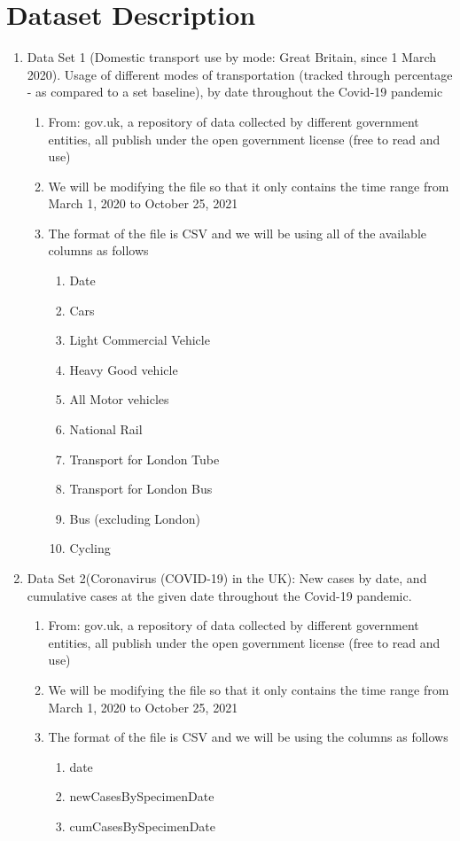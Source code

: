 \documentclass[fontsize=11pt]{article}
\begin{document}
  
\section*{Dataset Description}  
  
\begin{enumerate}  
    \item Data Set 1 (Domestic transport use by mode: Great Britain, since 1 March 2020).
Usage of different modes of transportation (tracked through percentage - as compared to a set baseline), by date throughout the Covid-19 pandemic
    \begin{enumerate}  
        \item From: gov.uk,  a repository of data collected by different government entities, all publish under the open government license (free to read and use)
        \item We will be modifying the file so that it only contains the time range from March 1, 2020 to October 25, 2021
        \item The format of the file is CSV and we will be using all of the available columns as follows
        \begin{enumerate}
            \item Date
            \item Cars
            \item Light Commercial Vehicle
            \item Heavy Good vehicle
            \item All Motor vehicles
            \item National Rail
            \item Transport for London Tube
            \item  Transport for London Bus
            \item Bus (excluding London)
            \item Cycling
        \end{enumerate}
    \end{enumerate}
    \item Data Set 2(Coronavirus (COVID-19) in the UK): New cases by date, and cumulative cases at the given date throughout the Covid-19 pandemic.
    \begin{enumerate}
        \item From: gov.uk,  a repository of data collected by different government entities, all publish under the open government license (free to read and use)
        \item We will be modifying the file so that it only contains the time range from March 1, 2020 to October 25, 2021
        \item The format of the file is CSV and we will be using the columns as follows
        \begin{enumerate}
            \item date
            \item newCasesBySpecimenDate
            \item cumCasesBySpecimenDate
        \end{enumerate}

    \end{enumerate}
\end{enumerate}
\end{document}
